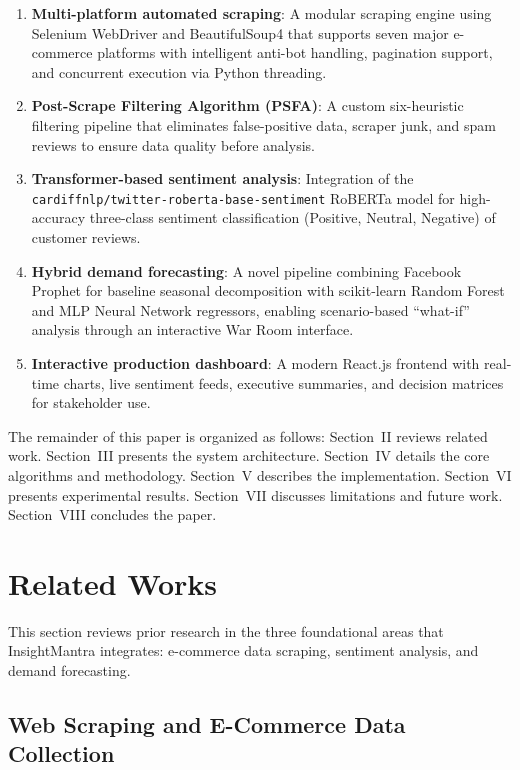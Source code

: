 \documentclass[conference]{IEEEtran}
\begin{document}
\begin{enumerate}
    \item \textbf{Multi-platform automated scraping}: A modular scraping engine using Selenium WebDriver and BeautifulSoup4 that supports seven major e-commerce platforms with intelligent anti-bot handling, pagination support, and concurrent execution via Python threading.
    \item \textbf{Post-Scrape Filtering Algorithm (PSFA)}: A custom six-heuristic filtering pipeline that eliminates false-positive data, scraper junk, and spam reviews to ensure data quality before analysis.
    \item \textbf{Transformer-based sentiment analysis}: Integration of the \texttt{cardiffnlp/twitter-roberta-base-sentiment} RoBERTa model for high-accuracy three-class sentiment classification (Positive, Neutral, Negative) of customer reviews.
    \item \textbf{Hybrid demand forecasting}: A novel pipeline combining Facebook Prophet for baseline seasonal decomposition with scikit-learn Random Forest and MLP Neural Network regressors, enabling scenario-based ``what-if'' analysis through an interactive War Room interface.
    \item \textbf{Interactive production dashboard}: A modern React.js frontend with real-time charts, live sentiment feeds, executive summaries, and decision matrices for stakeholder use.
\end{enumerate}

The remainder of this paper is organized as follows: Section~II reviews related work. Section~III presents the system architecture. Section~IV details the core algorithms and methodology. Section~V describes the implementation. Section~VI presents experimental results. Section~VII discusses limitations and future work. Section~VIII concludes the paper.

\section{Related Works}

This section reviews prior research in the three foundational areas that InsightMantra integrates: e-commerce data scraping, sentiment analysis, and demand forecasting.

\subsection{Web Scraping and E-Commerce Data Collection}
\end{document}
